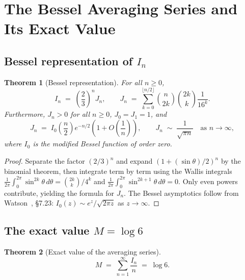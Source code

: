 \documentclass[12pt]{amsart}
\newtheorem{theorem}{Theorem}[section]
\begin{document}
\section{The Bessel Averaging Series and Its Exact Value}

\subsection{Bessel representation of $I_n$}

\begin{theorem}[Bessel representation]\label{thm:bessel}
For all $n\ge 0$,
\[
  I_n \;=\; \left(\frac{2}{3}\right)^{\!n} J_n,
  \qquad
  J_n \;=\; \sum_{k=0}^{\lfloor n/2\rfloor}
            \binom{n}{2k}\binom{2k}{k}\frac{1}{16^k}.
\]
Furthermore, $J_n>0$ for all $n\ge 0$, $J_0=J_1=1$, and
\[
  J_n \;=\; I_0\!\!\left(\frac{n}{2}\right)e^{-n/2}
        \!\left(1+O\!\left(\frac{1}{n}\right)\right),
  \qquad
  J_n \;\sim\; \frac{1}{\sqrt{\pi n}} \quad\text{as }n\to\infty,
\]
where $I_0$ is the modified Bessel function of order zero.
\end{theorem}

\begin{proof}
Separate the factor $(2/3)^n$ and expand
$(1+(\sin\theta)/2)^n$ by the binomial theorem, then integrate term
by term using the Wallis integrals
$\frac{1}{2\pi}\int_0^{2\pi}\sin^{2k}\theta\,d\theta=\binom{2k}{k}/4^k$
and $\frac{1}{2\pi}\int_0^{2\pi}\sin^{2k+1}\theta\,d\theta=0$.
Only even powers contribute, yielding the formula for $J_n$.
The Bessel asymptotics follow from Watson~\cite{Watson1944}, \S7.23:
$I_0(z)\sim e^z/\sqrt{2\pi z}$ as $z\to\infty$.
\end{proof}

\subsection{The exact value $M = \log 6$}

\begin{theorem}[Exact value of the averaging series]\label{thm:M}
\begin{equation}\label{eq:M-log6}
  M \;=\; \sum_{n=1}^{\infty}\frac{I_n}{n} \;=\; \log 6.
\end{equation}
\end{theorem}
\end{document}
